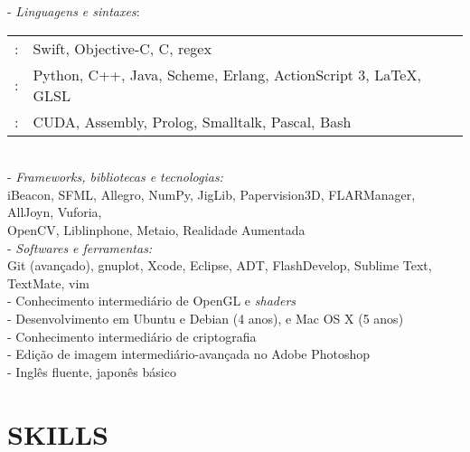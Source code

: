 \documentclass[]{res} %
\def \divspace{6pt}
\begin{document}
\begin{resume}
    - {\sl Linguagens e sintaxes}: \\
    \setlength\tabcolsep{2pt}
    \begin{tabular}{r l}
    \hspace*{1.5em}{\sl Fluente}:& Swift, Objective-C, C, regex \\
    \hspace*{1.5em}{\sl Muito Familiar}:& Python, C++, Java, Scheme, Erlang, ActionScript 3, \LaTeX, GLSL \\
    \hspace*{1.5em}{\sl Pouco Familiar}:& CUDA, Assembly, Prolog, Smalltalk, Pascal, Bash \\
    \end{tabular}
    \\
    - {\sl Frameworks, bibliotecas e tecnologias:} \\
    \hspace*{1.5em}iBeacon, SFML, Allegro, NumPy, JigLib, Papervision3D, FLARManager, AllJoyn, Vuforia, \\
    \hspace*{1.5em}OpenCV, Liblinphone, Metaio, Realidade Aumentada
    \\
    - {\sl Softwares e ferramentas:} \\
    \hspace*{1.5em}Git (avançado), gnuplot, Xcode, Eclipse, ADT, FlashDevelop, Sublime Text, TextMate, vim
    \\
    - Conhecimento intermediário de OpenGL e {\it shaders} \\
    - Desenvolvimento em Ubuntu e Debian (4 anos), e Mac OS X (5 anos) \\
    - Conhecimento intermediário de criptografia \\
    - Edição de imagem intermediário-avançada no Adobe Photoshop \\
    - Inglês fluente, japonês básico
\else
    \section{SKILLS \hspace{\divspace} }


\end{resume}
\end{document}
